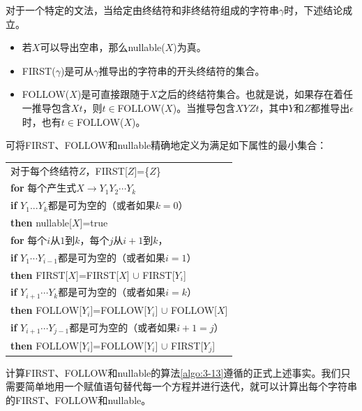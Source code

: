 \documentclass[cn,11pt,chinese]{elegantbook}
\begin{document}
对于一个特定的文法，当给定由终结符和非终结符组成的字符串$\gamma$时，下述结论成立。

\begin{itemize}
\item 若$X$可以导出空串，那么nullable($X$)为真。
\item FIRST($\gamma$)是可从$\gamma$推导出的字符串的开头终结符的集合。
\item FOLLOW($X$)是可直接跟随于$X$之后的终结符集合。也就是说，如果存在着任一推导包含$Xt$，则$t\in$FOLLOW($X$)。当推导包含$XYZt$，其中$Y$和$Z$都推导出$\epsilon$时，也有$t\in$FOLLOW($X$)。
\end{itemize}

可将FIRST、FOLLOW和nullable精确地定义为满足如下属性的最小集合：

\begin{tabular}{l}
对于每个终结符$Z$，FIRST[$Z$]=\{$Z$\} \\
\textbf{for} 每个产生式$X \rightarrow Y_1Y_2\cdots Y_k$ \\
\indent\textbf{if} $Y_1...Y_k$都是可为空的（或者如果$k=0$） \\
\indent\indent\textbf{then} nullable[$X$]=true \\
\indent\textbf{for} 每个$i$从$1$到$k$，每个$j$从$i+1$到$k$， \\
\indent\indent\textbf{if} $Y_1\cdots Y_{i-1}$都是可为空的（或者如果$i=1$） \\
\indent\indent\indent\textbf{then} FIRST[$X$]=FIRST[$X$] $\cup$ FIRST[$Y_i$] \\
\indent\indent\textbf{if} $Y_{i+1}\cdots Y_{k}$都是可为空的（或者如果$i=k$） \\
\indent\indent\indent\textbf{then} FOLLOW[$Y_i$]=FOLLOW[$Y_i$] $\cup$ FOLLOW[$X$] \\
\indent\indent\textbf{if} $Y_{i+1}\cdots Y_{j-1}$都是可为空的（或者如果$i+1=j$） \\
\indent\indent\indent\textbf{then} FOLLOW[$Y_i$]=FOLLOW[$Y_i$] $\cup$ FIRST[$Y_j$]
\end{tabular}

计算FIRST、FOLLOW和nullable的算法\ref{algo:3-13}遵循的正式上述事实。我们只需要简单地用一个赋值语句替代每一个方程并进行迭代，就可以计算出每个字符串的FIRST、FOLLOW和nullable。
\end{document}
